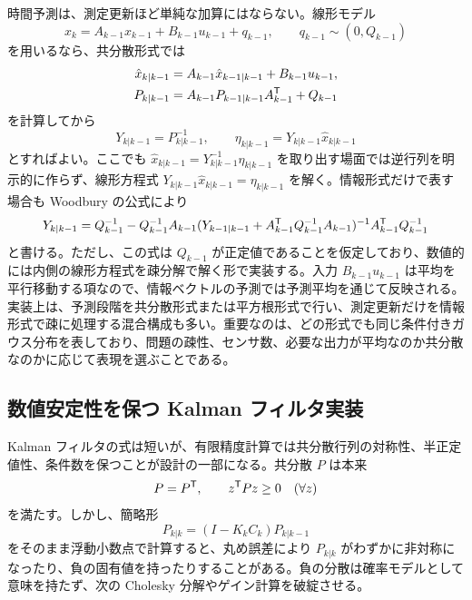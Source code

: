 時間予測は、測定更新ほど単純な加算にはならない。線形モデル
\begin{equation}
  x_k=A_{k-1}x_{k-1}+B_{k-1}u_{k-1}+q_{k-1},
  \qquad
  q_{k-1}\sim(0,Q_{k-1})
\end{equation}
を用いるなら、共分散形式では
\begin{align}
  \hat{x}_{k|k-1}
  &=A_{k-1}\hat{x}_{k-1|k-1}+B_{k-1}u_{k-1},\\
  P_{k|k-1}
  &=A_{k-1}P_{k-1|k-1}A_{k-1}^{\mathsf{T}}+Q_{k-1}
\end{align}
を計算してから
\begin{equation}
  Y_{k|k-1}=P_{k|k-1}^{-1},
  \qquad
  \eta_{k|k-1}=Y_{k|k-1}\hat{x}_{k|k-1}
  \label{eq:information-prediction-vector}
\end{equation}
とすればよい。ここでも $\hat{x}_{k|k-1}=Y_{k|k-1}^{-1}\eta_{k|k-1}$ を取り出す場面では逆行列を明示的に作らず、線形方程式 $Y_{k|k-1}\hat{x}_{k|k-1}=\eta_{k|k-1}$ を解く。情報形式だけで表す場合も Woodbury の公式により
\begin{equation}
  Y_{k|k-1}
  =
  Q_{k-1}^{-1}
  -Q_{k-1}^{-1}A_{k-1}
  (Y_{k-1|k-1}+A_{k-1}^{\mathsf{T}} Q_{k-1}^{-1}A_{k-1})^{-1}
  A_{k-1}^{\mathsf{T}} Q_{k-1}^{-1}
  \label{eq:information-prediction-matrix}
\end{equation}
と書ける。ただし、この式は $Q_{k-1}$ が正定値であることを仮定しており、数値的には内側の線形方程式を疎分解で解く形で実装する。入力 $B_{k-1}u_{k-1}$ は平均を平行移動する項なので、情報ベクトルの予測では予測平均を通じて反映される。実装上は、予測段階を共分散形式または平方根形式で行い、測定更新だけを情報形式で疎に処理する混合構成も多い。重要なのは、どの形式でも同じ条件付きガウス分布を表しており、問題の疎性、センサ数、必要な出力が平均なのか共分散なのかに応じて表現を選ぶことである。

\subsection{数値安定性を保つ Kalman フィルタ実装}

Kalman フィルタの式は短いが、有限精度計算では共分散行列の対称性、半正定値性、条件数を保つことが設計の一部になる。共分散 $P$ は本来
\begin{equation}
  P=P^{\mathsf{T}},
  \qquad
  z^{\mathsf{T}} Pz\ge0\quad(\forall z)
\end{equation}
を満たす。しかし、簡略形
\begin{equation}
  P_{k|k}=(I-K_kC_k)P_{k|k-1}
\end{equation}
をそのまま浮動小数点で計算すると、丸め誤差により $P_{k|k}$ がわずかに非対称になったり、負の固有値を持ったりすることがある。負の分散は確率モデルとして意味を持たず、次の Cholesky 分解やゲイン計算を破綻させる。

